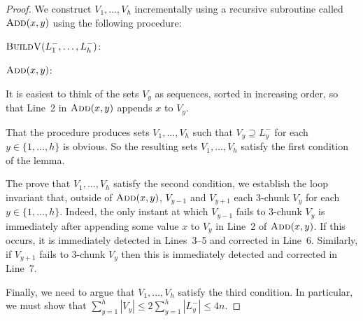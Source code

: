 \documentclass[kpfonts]{patmorin}
\begin{document}
\begin{proof}
  We construct $V_1,\ldots,V_{h}$ incrementally using a recursive subroutine called $\textsc{Add}(x, y)$ using the following procedure:
  
  \noindent$\textsc{BuildV}(L^-_1,\ldots,L^-_h)$:
  \begin{algorithmic}[1]
        \ENDIF
      \ENDFOR
    \ENDFOR
  \end{algorithmic}
  
  \noindent$\textsc{Add}(x, y)$:
  \begin{algorithmic}[1]
        \ENDIF
      \ENDIF
    \ENDIF
  \end{algorithmic}
  
  It is easiest to think of the sets $V_y$ as sequences, sorted in increasing order, so that Line~2 in $\textsc{Add}(x,y)$ appends $x$ to $V_y$.
  
  That the procedure produces sets $V_1,\ldots,V_h$ such that $V_y\supseteq L^-_y$ for each $y\in\{1,\ldots,h\}$ is obvious.  So the resulting sets $V_1,\ldots,V_h$ satisfy the first condition of the lemma.
  
  The prove that $V_1,\ldots,V_h$ satisfy the second condition, we establish the loop invariant that, outside of $\textsc{Add}(x,y)$, $V_{y-1}$ and $V_{y+1}$ each 3-chunk  $V_y$ for each $y\in\{1,\ldots,h\}$.  Indeed, the only instant at which $V_{y-1}$ fails to 3-chunk $V_y$ is immediately after appending some value $x$ to $V_y$ in Line~2 of $\textsc{Add}(x,y)$.  If this occurs, it is immediately detected in Lines~3--5 and corrected in Line~6.  Similarly, if $V_{y+1}$ fails to $3$-chunk $V_y$ then this is immediately detected and corrected in Line~7.
  
  Finally, we need to argue that $V_1,\ldots,V_h$ satisfy the third condition.  In particular, we must show that $\sum_{y=1}^h |V_y|\le 2\sum_{y=1}^h |L^-_y|\le 4n$.


\end{proof}
\end{document}
